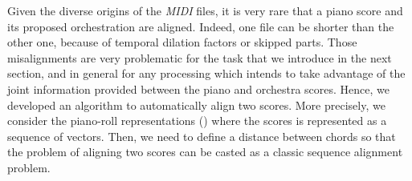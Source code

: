 \documentclass[twoside,twocolumn]{article}
\begin{document}
\label{:automatic-alignment}
Given the diverse origins of the \textit{MIDI} files, it is very rare that a piano score and its proposed orchestration are aligned. Indeed, one file can be shorter than the other one, because of temporal dilation factors or skipped parts.
Those misalignments are very problematic for the task that  we introduce in the next section, and in general for any processing which intends to take advantage of the joint information provided between the piano and orchestra scores. Hence, we developed an algorithm to automatically align two scores.
More precisely, we consider the piano-roll representations () where the scores is represented as a sequence of vectors. Then, we need to define a distance between chords so that the problem of aligning two scores can be casted as a classic sequence alignment problem.
\end{document}
